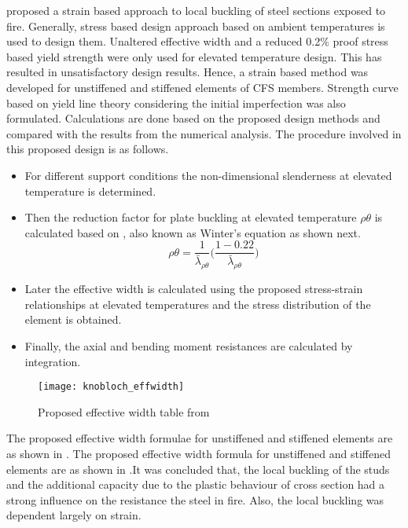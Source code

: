 \citet{Knobloch2006} proposed a strain based approach to local buckling of steel sections exposed to fire. Generally, stress based design approach based on ambient temperatures is used to design them. Unaltered effective width and a reduced 0.2\% proof stress based yield strength were only used for elevated temperature design. This has resulted in unsatisfactory design results. Hence, a strain based method was developed for unstiffened and stiffened elements of CFS members. Strength curve based on yield line theory considering the initial imperfection was also formulated. Calculations are done based on the proposed design methods and compared with the results from the numerical analysis. The procedure involved in this proposed design is as follows. 
\begin{itemize}
	\item For different support conditions the non-dimensional slenderness at elevated temperature is determined.
	\item Then the reduction factor for plate buckling at elevated temperature \(\rho\theta\) is calculated based on \citet{Desmond1981},  also known as Winter’s equation as shown next.
	\begin{equation}
	\rho \theta = \dfrac{1}{\bar{\lambda}_{\rho \theta}}\Bigg(\dfrac{1-0.22}{\bar{\lambda}_{\rho \theta}}\Bigg) 
	\end{equation}
	\item Later the effective width is calculated using the proposed stress-strain relationships at elevated temperatures and the stress distribution of the element is obtained.
	\item Finally, the axial and bending moment resistances are calculated by integration.
\end{itemize}
\begin{figure}[htbp]
	\centering
		\texttt{[image: knobloch\_effwidth]}		
		\caption{Proposed effective width table from \citet{Knobloch2006}}
			\label{fig:knobloch_effwidth}

	\end{figure}

The proposed effective width formulae for unstiffened and stiffened elements are as shown in . The proposed effective width formula for unstiffened and stiffened elements are as shown in .It was concluded that, the local buckling of the studs and the additional capacity due to the plastic behaviour of cross section had a strong influence on the resistance the steel in fire. Also, the local buckling was dependent largely on strain. 


